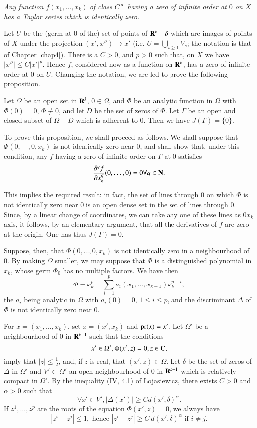 {\em Any function $f(x_{1},\ldots,x_{k})$ of class $C^{\infty}$ having a zero of infinite order at $0$ on $X$ has a Taylor series which is identically zero.}

Let $U$ be the (germ at $0$ of the) set of points of $\mathbf{R}^{k}-\delta$ which are images of points of $X$ under the projection $(x',x'')\to x'$ (i.e. $U=\bigcup\limits_{s\geq 1}V_{s}$; the notation is that of Chapter \ref{chap4}). There is a $C>0$, and $p>0$ such that, on $X$ we have $|x''|\leq C|x'|^{p}$. Hence $f$, considered now as a function on $\mathbf{R}^{k}$, has a zero of infinite order at $0$ on $U$. Changing the notation, we are led to prove the following proposition.

\begin{proposition}\label{chap6-prop3.6}
Let $\Omega$ be an open set in $\mathbf{R}^{k}$, $0\in \Omega$, and $\Phi$ be an analytic function in $\Omega$ with $\Phi(0)=0$, $\Phi\nequiv 0$, and let $D$ be the set of zeros of $\Phi$. Let $\Gamma$ be an open and closed subset of $\Omega-D$ which is adherent to $0$. Then we have $J(\Gamma)=\{0\}$.
\end{proposition}

To prove this proposition, we shall proceed as follows. We shall suppose that $\Phi(0,\quad,0,x_{k})$ is not identically zero near $0$, and shall show that, under this condition, any $f$ having a zero of infinite order on $\Gamma$ at $0$ satisfies
$$
\dfrac{\partial^{q}f}{\partial x^{q}_{k}}(0,\ldots,0)=0\forall q\in \mathbf{N}.
$$

This implies the required result: in fact, the set of lines through $0$ on which $\Phi$ is not identically zero near $0$ is an open dense set in the set of lines through $0$. Since, by a linear change of coordinates, we can take any one of these lines as $0x_{k}$ axis, it follows, by an elementary argument, that all the derivatives of $f$ are zero at the origin. One has thus $J(\Gamma)=0$.

Suppose, then, that $\Phi(0,\ldots,0,x_{k})$ is not identically zero in a neighbourhood of $0$. By making $\Omega$ smaller, we may suppose that $\Phi$ is a distinguished polynomial in $x_{k}$, whose germ $\Phi_{0}$ has no multiple factors. We have then
$$
\Phi=x^{p}_{k}+\sum\limits^{p}_{i=1}a_{i}(x_{1},\ldots,x_{k-1})x^{p-i}_{k},
$$
the $a_{i}$ being analytic in $\Omega$ with $a_{i}(0)=0$, $1\leq i\leq p$, and the discriminant $\Delta$ of $\Phi$ is not identically zero near $0$.

For $x=(x_{1},\ldots,x_{k})$, set $x=(x',x_{k})$ and $\operatorname{pr}(x)=x'$. Let $\Omega'$ be a neighbourhood of $0$ in $\mathbf{R}^{k-1}$ such that the conditions
$$
x'\in \Omega',\Phi(x',z)=0, z\in \mathbf{C},
$$
imply that $|z|\leq \frac{1}{2}$, and, if $z$ is real, that $(x',z)\in \Omega$. Let $\delta$ be the set of zeros of $\Delta$ in $\Omega'$ and $V'\subset \Omega'$ an open neighbourhood of $0$ in $\mathbf{R}^{k-1}$ which is relatively compact in $\Omega'$. By the inequality (IV, 4.1) of {\L}ojasiewicz, there exists $C>0$ and $\alpha>0$ such that
$$
\forall x'\in V', |\Delta(x')|\geq C d (x',\delta)^{\alpha}.
$$
If $z^{1},\ldots,z^{p}$ are the roots of the equation $\Phi(x',z)=0$, we always have
$$
|z^{i}-z^{j}|\leq 1, \text{ hence } |z^{i}-z^{j}|\geq C \ d(x',\delta)^{\alpha}\text{ if } i\neq j.
$$

